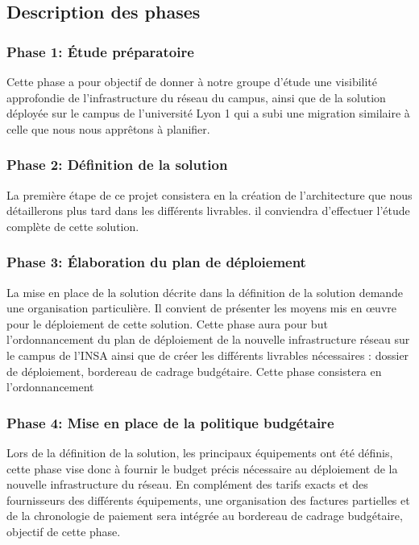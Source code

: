 \subsection{Description des phases}

\subsubsection{Phase 1: Étude préparatoire} Cette phase a pour objectif de donner à notre groupe d'étude une visibilité approfondie de l'infrastructure du réseau du campus, ainsi que de la solution déployée sur le campus de l'université Lyon 1 qui a subi une migration similaire à celle que nous nous apprêtons à planifier. 

\subsubsection{Phase 2: Définition de la solution} La première étape de ce projet consistera en la création de l'architecture que nous détaillerons plus tard dans les différents livrables. il conviendra d'effectuer l'étude complète de cette solution.

\subsubsection{Phase 3: Élaboration du plan de déploiement} La mise en place de la solution décrite dans la définition de la solution demande une organisation particulière. Il convient de présenter les moyens mis en œuvre pour le déploiement de cette solution. Cette phase aura pour but l'ordonnancement du plan de déploiement de la nouvelle infrastructure réseau sur le campus de l'INSA ainsi que de créer les différents livrables nécessaires : dossier de déploiement, bordereau de cadrage budgétaire. Cette phase consistera en l'ordonnancement

\subsubsection{Phase 4: Mise en place de la politique budgétaire} Lors de la définition de la solution, les principaux équipements ont été définis, cette phase vise donc à fournir le budget précis nécessaire au déploiement de la nouvelle infrastructure du réseau. En complément des tarifs exacts et des fournisseurs des différents équipements, une organisation des factures partielles et de la chronologie de paiement sera intégrée au bordereau de cadrage budgétaire, objectif de cette phase.
